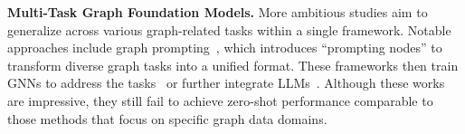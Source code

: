 

\textbf{Multi-Task Graph Foundation Models.} More ambitious studies aim to generalize across various graph-related tasks within a single framework. Notable approaches include graph prompting~\cite{liu2023graphprompt}, which introduces ``prompting nodes'' to transform diverse graph tasks into a unified format. These frameworks then train GNNs to address the tasks~\cite{li2024zerog, liu2023one, liu2024one} or further integrate LLMs~\cite{yang2024gl, kong2024gofa}. Although these works are impressive, they still fail to achieve zero-shot performance comparable to those methods that focus on specific graph data domains. %




